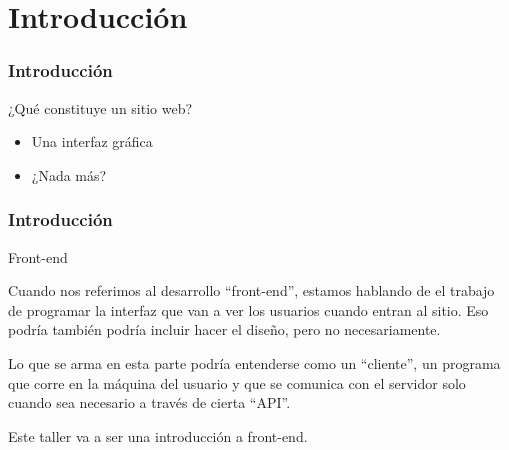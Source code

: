 \section{Introducción}\label{sec:Introducción}

\begin{frame}
    \frametitle{Introducción}
    \begin{tcolorbox}[colframe=color1]
        \begin{center}
        ¿Qué constituye un sitio web?
        \end{center}
    \end{tcolorbox}
    \begin{itemize}
        \item Una interfaz gráfica
        \item ¿Nada más?
    \end{itemize}
\end{frame}

\begin{frame}
\frametitle{Introducción}
    \begin{tcolorbox}[colframe=color1]
        \begin{center}
            Front-end
        \end{center}
    \end{tcolorbox}
    
    Cuando nos referimos al desarrollo ``front-end'', estamos hablando
    de el trabajo de programar la interfaz que van a ver los usuarios 
    cuando entran al sitio. Eso podría también podría incluir hacer 
    el diseño, pero no necesariamente. 
    
    Lo que se arma en esta parte podría entenderse como un ``cliente'', un 
    programa que corre en la máquina del usuario y que se comunica 
    con el servidor solo cuando sea necesario a través de cierta ``API''.

    Este taller va a ser una introducción a front-end.

\end{frame}

